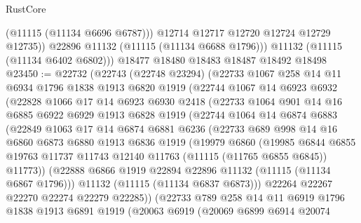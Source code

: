 \begin{lexlean}{RustCore}
\begin{coremodule}
              (@11115 (@11134 @6696 @6787)))
            @12714
            @12717
            @12720
            @12724
            @12729
            @12735))
        @22896
        @11132
        (@11115 (@11134 @6688 @1796)))
      @11132
      (@11115 (@11134 @6402 @6802)))
    @18477
    @18480
    @18483
    @18487
    @18492
    @18498
@23450 := @22732
    (@22743
      (@22748 @23294)
      (@22733
        @1067
        @258
        @14
        @11
        @6934
        @1796
        @1838
        @1913
        @6820
        @1919
        (@22744
          @1067
          @14
          @6923
          @6932
          (@22828
            @1066
            @17
            @14
            @6923
            @6930
            @2418
            (@22733
              @1064
              @901
              @14
              @16
              @6885
              @6922
              @6929
              @1913
              @6828
              @1919
              (@22744
                @1064
                @14
                @6874
                @6883
                (@22849
                  @1063
                  @17
                  @14
                  @6874
                  @6881
                  @6236
                  (@22733
                    @689
                    @998
                    @14
                    @16
                    @6860
                    @6873
                    @6880
                    @1913
                    @6836
                    @1919
                    (@19979
                      @6860
                      (@19985
                        @6844
                        @6855
                        @19763
                        @11737
                        @11743
                        @12140
                        @11763
                        (@11115 (@11765 @6855 @6845))
                        @11773))
                    (@22888 @6866 @1919 @22894 @22896 @11132 (@11115 (@11134 @6867 @1796)))
                    @11132
                    (@11115 (@11134 @6837 @6873)))
                  @22264
                  @22267
                  @22270
                  @22274
                  @22279
                  @22285))
              (@22733
                @789
                @258
                @14
                @11
                @6919
                @1796
                @1838
                @1913
                @6891
                @1919
                (@20063
                  @6919
                  (@20069
                    @6899
                    @6914
                    @20074

\end{coremodule}
\end{lexlean}
